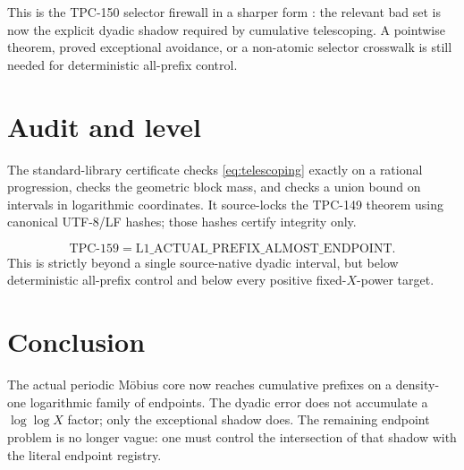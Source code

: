 \documentclass[11pt]{article}
\theoremstyle{definition}
\begin{document}
This is the TPC-150 selector firewall in a sharper form
\citep{WangTPC150}: the relevant bad set is now the explicit dyadic
shadow required by cumulative telescoping.  A pointwise theorem,
proved exceptional avoidance, or a non-atomic selector crosswalk is
still needed for deterministic all-prefix control.

\section{Audit and level}

The standard-library certificate checks \eqref{eq:telescoping}
exactly on a rational progression, checks the geometric block mass,
and checks a union bound on intervals in logarithmic coordinates.
It source-locks the TPC-149 theorem using canonical UTF-8/LF hashes;
those hashes certify integrity only.

\[
 \boxed{
 \mathrm{TPC\mbox{-}159}
 =
 \mathrm{L1\_ACTUAL\_PREFIX\_ALMOST\_ENDPOINT}.}
\]
This is strictly beyond a single source-native dyadic interval, but
below deterministic all-prefix control and below every positive
fixed-\(X\)-power target.

\section{Conclusion}

The actual periodic M\"obius core now reaches cumulative prefixes on
a density-one logarithmic family of endpoints.  The dyadic error
does not accumulate a \(\log\log X\) factor; only the exceptional
shadow does.  The remaining endpoint problem is no longer vague:
one must control the intersection of that shadow with the literal
endpoint registry.



\end{document}
